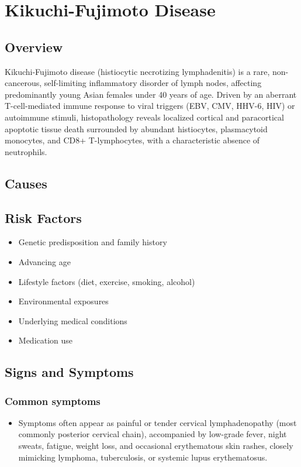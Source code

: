 \chapter{Kikuchi-Fujimoto Disease}
\label{sec:Kikuchi-Fujimoto Disease}

\section{Overview}
Kikuchi-Fujimoto disease (histiocytic necrotizing lymphadenitis) is a rare, non-cancerous, self-limiting inflammatory disorder of lymph nodes, affecting predominantly young Asian females under 40 years of age. Driven by an aberrant T-cell-mediated immune response to viral triggers (EBV, CMV, HHV-6, HIV) or autoimmune stimuli, histopathology reveals localized cortical and paracortical apoptotic tissue death surrounded by abundant histiocytes, plasmacytoid monocytes, and CD8+ T-lymphocytes, with a characteristic absence of neutrophils.
\section{Causes}
\section{Risk Factors}

\begin{itemize}[noitemsep]
  \item Genetic predisposition and family history
  \item Advancing age
  \item Lifestyle factors (diet, exercise, smoking, alcohol)
  \item Environmental exposures
  \item Underlying medical conditions
  \item Medication use
\end{itemize}
\section{Signs and Symptoms}

\subsection{Common symptoms}
\begin{itemize}[noitemsep]
  \item Symptoms often appear as painful or tender cervical lymphadenopathy (most commonly posterior cervical chain), accompanied by low-grade fever, night sweats, fatigue, weight loss, and occasional erythematous skin rashes, closely mimicking lymphoma, tuberculosis, or systemic lupus erythematosus. 
  \end{itemize}

